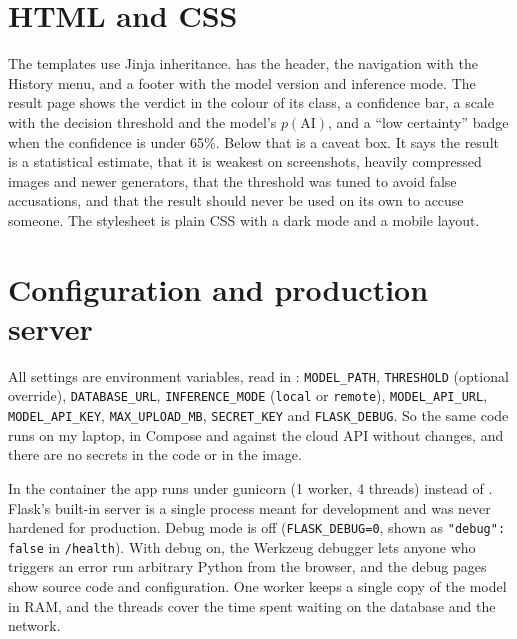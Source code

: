 
\section{HTML and CSS}
The templates use Jinja inheritance.  has the header, the navigation with the
History menu, and a footer with the model version and inference mode. The result page shows the
verdict in the colour of its class, a confidence bar, a scale with the decision threshold and the
model's $p(\text{AI})$, and a ``low certainty'' badge when the confidence is under 65\%. Below that
is a caveat box. It says the result is a statistical estimate, that it is weakest on screenshots,
heavily compressed images and newer generators, that the threshold was tuned to avoid false
accusations, and that the result should never be used on its own to accuse someone. The stylesheet
is plain CSS with a dark mode and a mobile layout.


\section{Configuration and production server}
All settings are environment variables, read in : \texttt{MODEL\_PATH},
\texttt{THRESHOLD} (optional override), \texttt{DATABASE\_URL}, \texttt{INFERENCE\_MODE}
(\texttt{local} or \texttt{remote}), \texttt{MODEL\_API\_URL}, \texttt{MODEL\_API\_KEY},
\texttt{MAX\_UPLOAD\_MB}, \texttt{SECRET\_KEY} and \texttt{FLASK\_DEBUG}. So the same code runs on
my laptop, in Compose and against the cloud API without changes, and there are no secrets in the
code or in the image.

In the container the app runs under gunicorn (1 worker, 4 threads) instead of .
Flask's built-in server is a single process meant for development and was never hardened for
production. Debug mode is off (\texttt{FLASK\_DEBUG=0}, shown as \texttt{"debug": false} in
\texttt{/health}). With debug on, the Werkzeug debugger lets anyone who triggers an error run
arbitrary Python from the browser, and the debug pages show source code and configuration. One
worker keeps a single copy of the model in RAM, and the threads cover the time spent waiting on the
database and the network.

